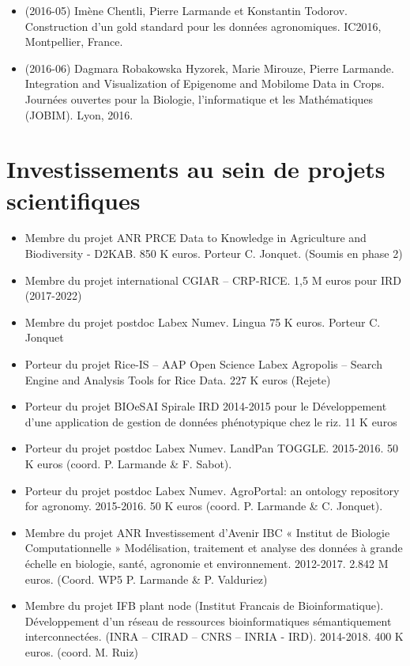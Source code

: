 \begin{itemize}
\item (2016-05) Imène Chentli, Pierre Larmande et Konstantin Todorov. Construction d’un gold standard pour les données agronomiques. IC2016, Montpellier, France.
\item (2016-06) Dagmara Robakowska Hyzorek, Marie Mirouze, Pierre Larmande. Integration and Visualization of Epigenome and Mobilome Data in Crops. Journées ouvertes pour la Biologie, l’informatique et les Mathématiques (JOBIM). Lyon, 2016.
\end{itemize}


\section{Investissements au sein de projets scientifiques}
\begin{itemize}
\item Membre du projet ANR PRCE Data to Knowledge in Agriculture and Biodiversity - D2KAB. 850 K euros. Porteur C. Jonquet. (Soumis en phase 2)
\item Membre du projet international CGIAR – CRP-RICE. 1,5 M euros pour IRD (2017-2022)
\item Membre du projet postdoc Labex Numev. Lingua 75 K euros. Porteur C. Jonquet
\item Porteur du projet Rice-IS – AAP Open Science Labex Agropolis – Search Engine and Analysis Tools for Rice Data. 227 K euros (Rejete)
\item Porteur du projet BIOeSAI Spirale IRD 2014-2015 pour le Développement d’une application de gestion de données phénotypique chez le riz. 11 K euros 
\item Porteur du projet postdoc Labex Numev. LandPan TOGGLE. 2015-2016. 50 K euros (coord. P. Larmande \& F. Sabot).

\item Porteur du projet postdoc Labex Numev. AgroPortal: an ontology repository for agronomy. 2015-2016. 50 K euros (coord. P. Larmande \& C. Jonquet).

\item Membre du projet ANR Investissement d’Avenir IBC « Institut de Biologie Computationnelle » Modélisation, traitement et analyse des données à grande échelle en biologie, santé, agronomie et environnement. 2012-2017. 2.842 M euros. (Coord. WP5 P. Larmande \& P. Valduriez)

\item Membre du projet IFB plant node  (Institut Francais de Bioinformatique).  Développement d’un réseau de ressources bioinformatiques sémantiquement interconnectées. (INRA – CIRAD – CNRS – INRIA  - IRD). 2014-2018. 400 K euros.  (coord. M. Ruiz) 


\end{itemize}
